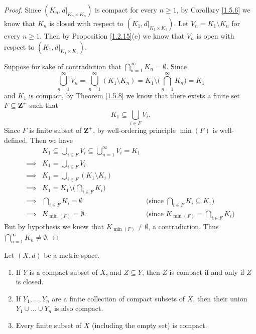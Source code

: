\begin{proof}
    Since \((K_n, d|_{K_n \times K_n})\) is compact for every \(n \geq 1\), by Corollary \ref{1.5.6} we know that \(K_n\) is closed with respect to \((K_1, d|_{K_1 \times K_1})\).
    Let \(V_n = K_1 \setminus K_n\) for every \(n \geq 1\).
    Then by Proposition \ref{1.2.15}(e) we know that \(V_n\) is open with respect to \((K_1, d|_{K_1 \times K_1})\).

    Suppose for sake of contradiction that \(\bigcap_{n = 1}^\infty K_n = \emptyset\).
    Since
    \[
        \bigcup_{n = 1}^\infty V_n = \bigcup_{n = 1}^\infty (K_1 \setminus K_n) = K_1 \setminus \bigg(\bigcap_{n = 1}^\infty K_n\bigg) = K_1
    \]
    and \(K_1\) is compact, by Theorem \ref{1.5.8} we know that there exists a finite set \(F \subseteq \mathbf{Z}^+\) such that
    \[
        K_1 \subseteq \bigcup_{i \in F} V_i.
    \]
    Since \(F\) is finite subset of \(\mathbf{Z}^+\), by well-ordering principle \(\min(F)\) is well-defined.
    Then we have
    \begin{align*}
                 & K_1 \subseteq \bigcup_{i \in F} V_i \subseteq \bigcup_{n = 1}^\infty V_i = K_1                                                          \\
        \implies & K_1 = \bigcup_{i \in F} V_i                                                                                                             \\
        \implies & K_1 = \bigcup_{i \in F} (K_1 \setminus K_i)                                                                                             \\
        \implies & K_1 = K_1 \setminus \bigg(\bigcap_{i \in F} K_i\bigg)                                                                                   \\
        \implies & \bigcap_{i \in F} K_i = \emptyset                                              & \text{(since \(\bigcap_{i \in F} K_i \subseteq K_1)\)} \\
        \implies & K_{\min(F)} = \emptyset.                                                       & \text{(since \(K_{\min(F)} = \bigcap_{i \in F} K_i)\)}
    \end{align*}
    But by hypothesis we know that \(K_{\min(F)} \neq \emptyset\), a contradiction.
    Thus \(\bigcap_{n = 1}^\infty K_n \neq \emptyset\).
\end{proof}

\begin{theorem}\label{1.5.10}
    Let \((X, d)\) be a metric space.
    \begin{enumerate}
        \item If \(Y\) is a compact subset of \(X\), and \(Z \subseteq Y\), then \(Z\) is compact if and only if \(Z\) is closed.
        \item If \(Y_1, \dots, Y_n\) are a finite collection of compact subsets of \(X\), then their union \(Y_1 \cup \dots \cup Y_n\) is also compact.
        \item Every finite subset of \(X\) (including the empty set) is compact.
    \end{enumerate}
\end{theorem}


